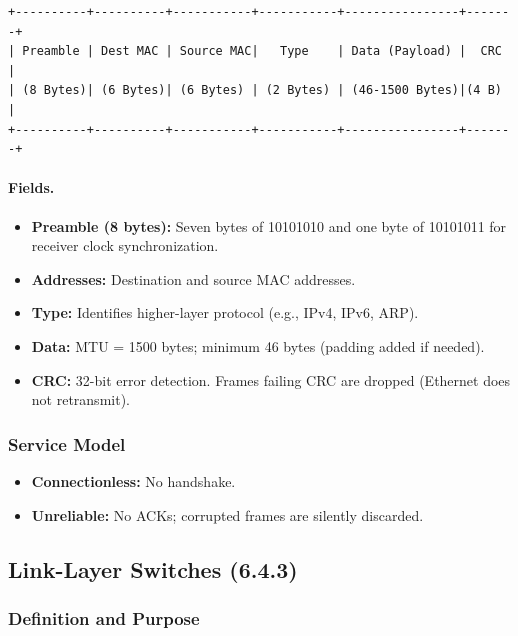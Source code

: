 \documentclass[12pt]{article}
\begin{document}
\begin{verbatim}
+----------+----------+-----------+-----------+----------------+-------+
| Preamble | Dest MAC | Source MAC|   Type    | Data (Payload) |  CRC  |
| (8 Bytes)| (6 Bytes)| (6 Bytes) | (2 Bytes) | (46-1500 Bytes)|(4 B)  |
+----------+----------+-----------+-----------+----------------+-------+
\end{verbatim}

\paragraph{Fields.}

\begin{itemize}
    \item \textbf{Preamble (8 bytes):} Seven bytes of 10101010 and one byte of 10101011 for receiver clock synchronization.
    \item \textbf{Addresses:} Destination and source MAC addresses.
    \item \textbf{Type:} Identifies higher-layer protocol (e.g., IPv4, IPv6, ARP).
    \item \textbf{Data:} MTU = 1500 bytes; minimum 46 bytes (padding added if needed).
    \item \textbf{CRC:} 32-bit error detection. Frames failing CRC are dropped (Ethernet does not retransmit).
\end{itemize}

\subsubsection{Service Model}

\begin{itemize}
    \item \textbf{Connectionless:} No handshake.
    \item \textbf{Unreliable:} No ACKs; corrupted frames are silently discarded.
\end{itemize}

\subsection{Link-Layer Switches (6.4.3)}

\subsubsection{Definition and Purpose}
\end{document}
